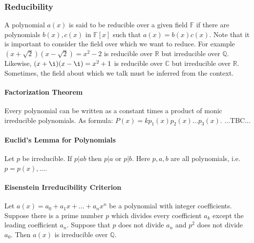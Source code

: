\subsubsection{Reducibility}
A polynomial $a(x)$ is said to be reducible over a given field $\mathbb{F}$ if there are polynomials $b(x), c(x)$ in $\mathbb{F}[x]$ such that $a(x) = b(x) c(x)$. Note that it is important to consider the field over which we want to reduce. For example $(x+\sqrt{2})(x-\sqrt{2}) = x^2 - 2$ is reducible over $\mathbb{R}$ but irreducible over $\mathbb{Q}$. Likewise, $(x+\i)(x-\i) = x^2 + 1$ is reducible over $\mathbb{C}$ but irreducible over $\mathbb{R}$. Sometimes, the field about which we talk must be inferred from the context.


\paragraph{Factorization Theorem}
Every polynomial can be written as a constant times a product of monic irreducible polynomials. As formula: $P(x) = k p_1(x) p_2(x) \ldots p_3(x)$.  ...TBC...

\paragraph{Euclid's Lemma for Polynomials}
Let $p$ be irreducible. If $p|ab$ then $p|a$ or $p|b$. Here $p,a,b$ are all polynomials, i.e. $p = p(x), \ldots$.



\paragraph{Eisenstein Irreducibility Criterion}
Let $a(x) = a_0 + a_1 x + \ldots + a_n x^n$ be a polynomial with integer coefficients. Suppose there is a prime number $p$ which divides every coefficient $a_k$ except the leading coefficient $a_n$. Suppose that $p$ does not divide $a_n$ and $p^2$ does not divide $a_0$. Then $a(x)$ is irreducible over $\mathbb{Q}$.




